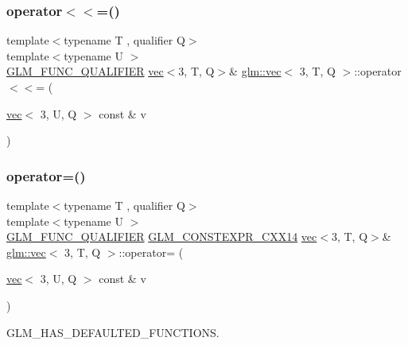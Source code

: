 \subsubsection{\texorpdfstring{operator$<$$<$=()}{operator<<=()}\hspace{0.1cm}{\footnotesize\ttfamily [6/6]}}
{\footnotesize\ttfamily template$<$typename T , qualifier Q$>$ \\
template$<$typename U $>$ \\
\mbox{\hyperlink{setup_8hpp_a33fdea6f91c5f834105f7415e2a64407}{G\+L\+M\+\_\+\+F\+U\+N\+C\+\_\+\+Q\+U\+A\+L\+I\+F\+I\+ER}} \mbox{\hyperlink{structglm_1_1vec}{vec}}$<$3, T, Q$>$\& \mbox{\hyperlink{structglm_1_1vec}{glm\+::vec}}$<$ 3, T, Q $>$\+::operator$<$$<$= (\begin{DoxyParamCaption}\item[{\mbox{\hyperlink{structglm_1_1vec}{vec}}$<$ 3, U, Q $>$ const \&}]{v }\end{DoxyParamCaption})}

\mbox{\label{structglm_1_1vec_3_013_00_01_t_00_01_q_01_4_a8d40afef0f44dc9e5c765029f6af40df}} 
\subsubsection{\texorpdfstring{operator=()}{operator=()}\hspace{0.1cm}{\footnotesize\ttfamily [1/3]}}
{\footnotesize\ttfamily template$<$typename T , qualifier Q$>$ \\
template$<$typename U $>$ \\
\mbox{\hyperlink{setup_8hpp_a33fdea6f91c5f834105f7415e2a64407}{G\+L\+M\+\_\+\+F\+U\+N\+C\+\_\+\+Q\+U\+A\+L\+I\+F\+I\+ER}} \mbox{\hyperlink{setup_8hpp_a4dd12abf5e1164bc57f3a34671d03844}{G\+L\+M\+\_\+\+C\+O\+N\+S\+T\+E\+X\+P\+R\+\_\+\+C\+X\+X14}} \mbox{\hyperlink{structglm_1_1vec}{vec}}$<$3, T, Q$>$\& \mbox{\hyperlink{structglm_1_1vec}{glm\+::vec}}$<$ 3, T, Q $>$\+::operator= (\begin{DoxyParamCaption}\item[{\mbox{\hyperlink{structglm_1_1vec}{vec}}$<$ 3, U, Q $>$ const \&}]{v }\end{DoxyParamCaption})}



G\+L\+M\+\_\+\+H\+A\+S\+\_\+\+D\+E\+F\+A\+U\+L\+T\+E\+D\+\_\+\+F\+U\+N\+C\+T\+I\+O\+NS. 

